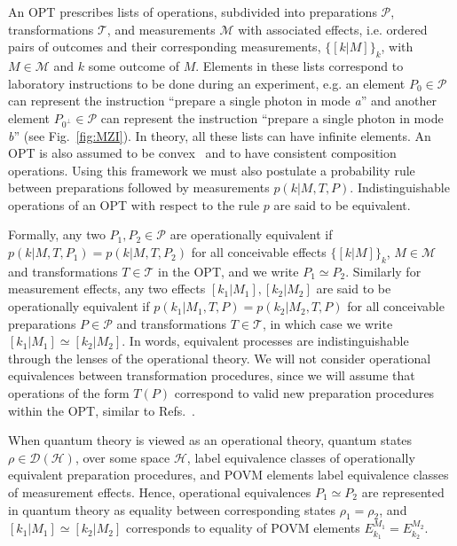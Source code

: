 \documentclass[letterpaper,onecolumn,12pt,accepted=2024-01-17]{article}
\begin{document}
An OPT prescribes lists of operations, subdivided into preparations $\mathcal{P}$, transformations $\mathcal{T}$, and measurements $\mathcal{M}$ with associated effects{, i.e. ordered pairs of outcomes and their corresponding measurements,} $\{[k \vert M]\}_k${, with $M \in \mathcal{M}$ and $k$ some outcome of $M$}. Elements in these lists correspond to laboratory instructions to be done during an experiment, e.g. an element $P_0 \in \mathcal{P}$ can represent the instruction ``prepare a single photon in mode \textit{a}'' and another element $P_{0^\perp} \in \mathcal{P}$ can represent the instruction  ``prepare a single photon in mode \textit{b}'' (see Fig.~\ref{fig:MZI}). In theory, all these lists can have infinite elements. An OPT is also assumed to be convex~\cite{schmid2020structure} and to have consistent composition operations.  Using this framework we must also postulate  a probability rule between preparations followed by measurements $p(k\vert M,T,P)$. Indistinguishable operations of an OPT with respect to the rule $p$ are said to be equivalent. 

Formally, any two $P_1,P_2 \in \mathcal{P}$ are operationally equivalent if $p(k\vert M,T,P_1) = p(k \vert M,T,P_2)$ for all conceivable effects $\{[k \vert M]\}_k$, $M \in \mathcal{M}$ and transformations $T \in \mathcal{T}$ in the OPT, and we write $P_1 \simeq P_2$. Similarly for measurement effects{, any two effects $[k_1|M_1], [k_2|M_2]$ are said to be operationally equivalent if $p(k_1|M_1,T,P) = p(k_2|M_2,T,P)$ for all conceivable preparations $P \in \mathcal{P}$ and transformations $T \in \mathcal{T}$, in which case we write $[k_1|M_1] \simeq [k_2|M_2]$}. In words, equivalent processes are indistinguishable through the lenses of the operational theory. We will not consider operational equivalences between transformation procedures, since we will assume that operations of the form $T(P)$ correspond to valid new preparation procedures within the OPT, similar to Refs.~\cite{Lostaglio2020contextualadvantage,baldijao_emergence_2021}.

When quantum theory is viewed as an operational theory, quantum states $\rho \in \mathcal{D}(\mathcal{H})$, over some space $\mathcal{H}$, label equivalence classes of operationally equivalent preparation procedures, and POVM elements label equivalence classes of measurement effects. Hence, operational equivalences $P_1\simeq P_2$ are represented in quantum theory as equality between corresponding states $\rho_1 = \rho_2$, and $[k_1\vert M_1]\simeq [k_2\vert M_2]$ corresponds to equality of POVM elements $E_{k_1}^{M_1} = E_{k_2}^{M_2}$.
\end{document}
